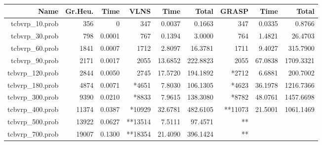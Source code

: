 \documentclass[a4paper]{scrartcl}
\begin{document}




\begin{tabular}{r | r | r | r | r | r | r | r | r}
\hline
Name & Gr.Heu. & Time &  VLNS & Time & Total & GRASP & Time & Total \\
\hline \hline 
tcbvrp\_10.prob & 356 & 0 & 347 & 0.0037 & 0.1663 & 347 & 0.0335 & 0.8766 \\
\hline
tcbvrp\_30.prob & 798 & 0.0001 & 767 & 0.1394 & 3.0000 & 764 & 1.4821 & 26.4703 \\
\hline
tcbvrp\_60.prob & 1841 & 0.0007 & 1712 & 2.8097 & 16.3781 & 1711 & 9.4027 & 315.7900 \\
\hline
tcbvrp\_90.prob & 2171 & 0.0017 & 2055 & 13.6852 & 222.8823 & 2055 & 67.0838 & 1709.3321\\
\hline
tcbvrp\_120.prob & 2844 & 0.0050 & 2745 & 17.5720 & 194.1892 & *2712 & 6.6881 & 200.7002 \\
\hline
tcbvrp\_180.prob & 4874 & 0.0071 & *4651 & 7.8030 & 106.1305 & *4623 & 36.1978 & 1216.7366 \\
\hline
tcbvrp\_300.prob & 9390 & 0.0210 & *8833 & 7.9615 & 138.3080 & *8782 & 48.0761 & 1457.6698 \\
\hline
tcbvrp\_400.prob & 11374 & 0.0387 & *10929 & 32.6781 & 482.6105 & **11073 & 21.5001 & 1061.1469 \\
\hline
tcbvrp\_500.prob & 13922 & 0.0627 & **13514 & 7.5111 & 97.4571 & ** \\
\hline
tcbvrp\_700.prob & 19007 & 0.1300 & **18354 & 21.4090 & 396.1424 & ** \\
\hline
\end{tabular}




\end{document}
